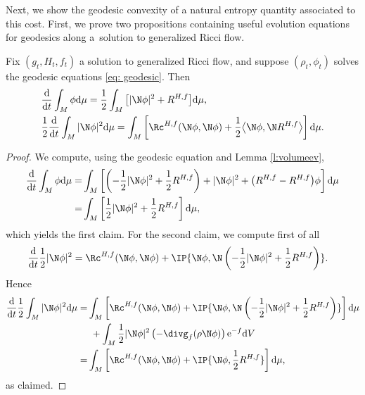 Next, we show the geodesic convexity of a natural entropy quantity associated to this cost. First, we prove two propositions containing useful evolution equations for geodesics along a~solution to generalized Ricci flow.

\begin{Lemma}\label{lem: evolution entropy 1} Fix $(g_t, H_t, f_t)$ a solution to generalized Ricci flow, and suppose $(\rho_t,\phi_t)$ solves the geodesic equations \eqref{eq: geodesic}. Then
	\begin{align*}
	&\frac{{\rm d}}{{\rm d}t}\int_M\phi {\rm d}\mu=\frac12\int_M\big[|\N \phi|^2+R^{H,f}\big] {\rm d}\mu,\\
&	\frac12	\frac{{\rm d}}{{\rm d}t}\int_M|\N\phi|^2 {\rm d}\mu=\int_M \left[\Rc^{H,f}(\N\phi,\N\phi) + \frac12\big\langle \N\phi,\N R^{H,f}\big\rangle\right] {\rm d}\mu.
	\end{align*}
\end{Lemma}

\begin{proof}
	We compute, using the geodesic equation and Lemma \ref{l:volumeev},
	\begin{align*}
	\frac{{\rm d}}{{\rm d}t}\int_M\phi {\rm d}\mu =&\int_M\left[\left(-\frac12|\N\phi|^2+\frac12 R^{H,f}\right)+|\N\phi|^2+\big(R^{H,f}-R^{H,f}\big)\phi\right] {\rm d}\mu\\
	=&\int_M\left[\frac12|\N\phi|^2+\frac12 R^{H,f}\right] {\rm d}\mu,
	\end{align*}
	which yields the first claim. For the second claim, we compute first of all
	\begin{align*}
	\frac{{\rm d}}{{\rm d}t}\frac12|\N\phi|^2={}&\Rc^{H,f}(\N\phi,\N\phi) +\IP{\N\phi,\N\left( -\frac12|\N\phi|^2+\frac12R^{H,f} \right)}.
	\end{align*}
	Hence
	\begin{align*}
	\frac{{\rm d}}{{\rm d}t}\frac12\int_M |\N\phi|^2 {\rm d}\mu=&\int_M \left[\Rc^{H,f}(\N\phi,\N\phi) +\IP{\N\phi,\N\left( -\frac12|\N\phi|^2+\frac12R^{H,f} \right)}\right] {\rm d}\mu\\
	&\ +\int_M \frac12|\N\phi|^2 \left(-\divg_f(\rho\N\phi) \right) {\rm e}^{-f} {\rm d}V\\
	=&\int_M \left[\Rc^{H,f}(\N\phi,\N\phi) +\IP{\N\phi,\frac12R^{H,f}}\right] {\rm d}\mu,
	\end{align*}
 as claimed.
\end{proof}

